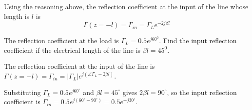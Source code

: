 \documentclass{ximera}
\begin{document}
Using the reasoning above, the reflection coefficient at the input of the line whose length is $l$ is
\begin{equation}
\Gamma(z=-l)=\Gamma_{in}=\Gamma_L e^{-2j \beta l}
\end{equation}

\begin{example}
The reflection coefficient at the load is $\Gamma_L=0.5 e^{j60^0}$. Find the input reflection coefficient if the electrical length of the line is $\beta l= 45^0$.

\begin{explanation}
The reflection coefficient at the input of the line is $\Gamma(z=-l)=\Gamma_{in}=|\Gamma_L| e^{j ( \angle \Gamma_L - 2 \beta l) }$. 

Substituting $\Gamma_L=0.5e^{j60^\circ}$ and $\beta l=45^\circ$
gives $2\beta l=90^\circ$, so the input reflection coefficient is
$\Gamma_{in}=0.5e^{j(60^\circ-90^\circ)}=0.5e^{-j30^\circ}$.

\end{explanation}

\end{example}
\end{document}

